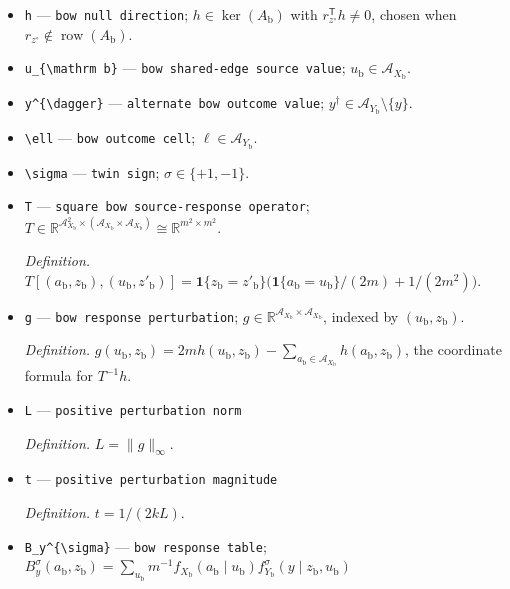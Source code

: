 \documentclass{article}
\begin{document}
\begin{itemize}
  \item \texttt{h} --- \texttt{bow null direction}; \(h\in\ker(A_{\mathrm b})\) with \(r_{z^{\circ}}^{\mathsf T}h\ne0\), chosen when \(r_{z^{\circ}}\notin\operatorname{row}(A_{\mathrm b})\).
  \item \texttt{u\_\allowbreak{}\{\textbackslash{}\allowbreak{}mathrm b\}\allowbreak{}} --- \texttt{bow shared-\allowbreak{}edge source value}; \(u_{\mathrm b}\in\mathcal A_{X_{\mathrm b}}\).
  \item \texttt{y\textasciicircum{}\{\textbackslash{}\allowbreak{}dagger\}\allowbreak{}} --- \texttt{alternate bow outcome value}; \(y^{\dagger}\in\mathcal A_{Y_{\mathrm b}}\setminus\{y\}\).
  \item \texttt{\textbackslash{}\allowbreak{}ell} --- \texttt{bow outcome cell}; \(\ell\in\mathcal A_{Y_{\mathrm b}}\).
  \item \texttt{\textbackslash{}\allowbreak{}sigma} --- \texttt{twin sign}; \(\sigma\in\{+1,-1\}\).
  \item \texttt{T} --- \texttt{square bow source-\allowbreak{}response operator}; \(T\in\mathbb R^{\mathcal A_{X_{\mathrm b}}^2\times(\mathcal A_{X_{\mathrm b}}\times\mathcal A_{X_{\mathrm b}})}\cong\mathbb R^{m^2\times m^2}\).
  \par\smallskip\noindent\emph{Definition.} \(T[(a_{\mathrm b},z_{\mathrm b}),(u_{\mathrm b},z'_{\mathrm b})]=\mathbf 1\{z_{\mathrm b}=z'_{\mathrm b}\}\bigl(\mathbf 1\{a_{\mathrm b}=u_{\mathrm b}\}/(2m)+1/(2m^2)\bigr)\).
  \item \texttt{g} --- \texttt{bow response perturbation}; \(g\in\mathbb R^{\mathcal A_{X_{\mathrm b}}\times\mathcal A_{X_{\mathrm b}}}\), indexed by \((u_{\mathrm b},z_{\mathrm b})\).
  \par\smallskip\noindent\emph{Definition.} \(g(u_{\mathrm b},z_{\mathrm b})=2m h(u_{\mathrm b},z_{\mathrm b})-\sum_{a_{\mathrm b}\in\mathcal A_{X_{\mathrm b}}}h(a_{\mathrm b},z_{\mathrm b})\), the coordinate formula for \(T^{-1}h\).
  \item \texttt{L} --- \texttt{positive perturbation norm}
  \par\smallskip\noindent\emph{Definition.} \(L=\lVert g\rVert_{\infty}\).
  \item \texttt{t} --- \texttt{positive perturbation magnitude}
  \par\smallskip\noindent\emph{Definition.} \(t=1/(2kL)\).
  \item \texttt{B\_\allowbreak{}y\textasciicircum{}\{\textbackslash{}\allowbreak{}sigma\}\allowbreak{}} --- \texttt{bow response table}; \(B_y^{\sigma}(a_{\mathrm b},z_{\mathrm b})=\sum_{u_{\mathrm b}}m^{-1}f_{X_{\mathrm b}}(a_{\mathrm b}\mid u_{\mathrm b})f_{Y_{\mathrm b}}^{\sigma}(y\mid z_{\mathrm b},u_{\mathrm b})\)

\end{itemize}
\end{document}
